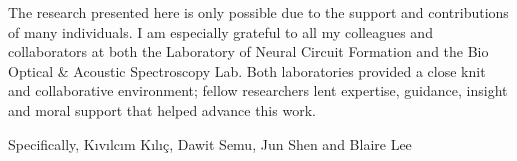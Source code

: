 
The research presented here is only possible due to the support and 
contributions of many individuals. I am especially grateful to all my 
colleagues and collaborators at both the Laboratory of Neural 
Circuit Formation and the Bio Optical \& Acoustic Spectroscopy Lab. 
Both laboratories provided a close knit and collaborative environment; 
fellow researchers lent expertise, guidance, insight and moral support 
that helped advance this work. 

Specifically, K{\i}v{\i}lc{\i}m K{\i}l{\i}\c{c},
Dawit Semu, Jun Shen and Blaire Lee



%
%

